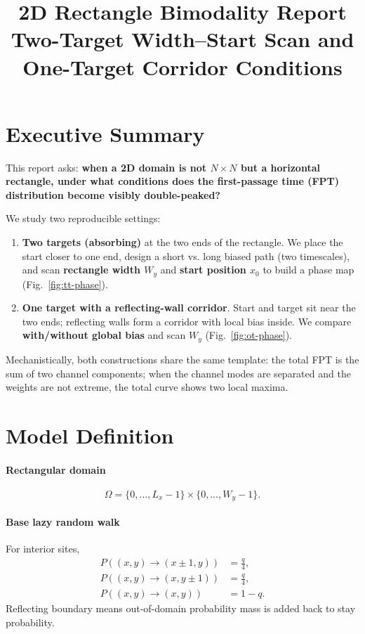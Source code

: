 \documentclass[11pt]{article}
\title{2D Rectangle Bimodality Report\\\large Two-Target Width--Start Scan and One-Target Corridor Conditions}
\author{}
\date{}
\begin{document}
\maketitle

\section*{Executive Summary}
This report asks: \textbf{when a 2D domain is not $N\times N$ but a horizontal rectangle, under what conditions does the first-passage time (FPT) distribution become visibly double-peaked?}

We study two reproducible settings:
\begin{enumerate}
  \item \textbf{Two targets (absorbing)} at the two ends of the rectangle. We place the start closer to one end, design a short vs. long biased path (two timescales), and scan \textbf{rectangle width $W_y$} and \textbf{start position $x_0$} to build a phase map (Fig.~\ref{fig:tt-phase}).
  \item \textbf{One target with a reflecting-wall corridor}. Start and target sit near the two ends; reflecting walls form a corridor with local bias inside. We compare \textbf{with/without global bias} and scan $W_y$ (Fig.~\ref{fig:ot-phase}).
\end{enumerate}

Mechanistically, both constructions share the same template: the total FPT is the sum of two channel components; when the channel modes are separated and the weights are not extreme, the total curve shows two local maxima.

\section{Model Definition}
\paragraph{Rectangular domain}
\[
\Omega=\{0,\dots,L_x-1\}\times\{0,\dots,W_y-1\}.
\]

\paragraph{Base lazy random walk}
For interior sites,
\begin{align}
P((x,y)\to(x\pm1,y))&=\frac{q}{4},\\
P((x,y)\to(x,y\pm1))&=\frac{q}{4},\\
P((x,y)\to(x,y))&=1-q.
\end{align}
Reflecting boundary means out-of-domain probability mass is added back to stay probability.
\end{document}
